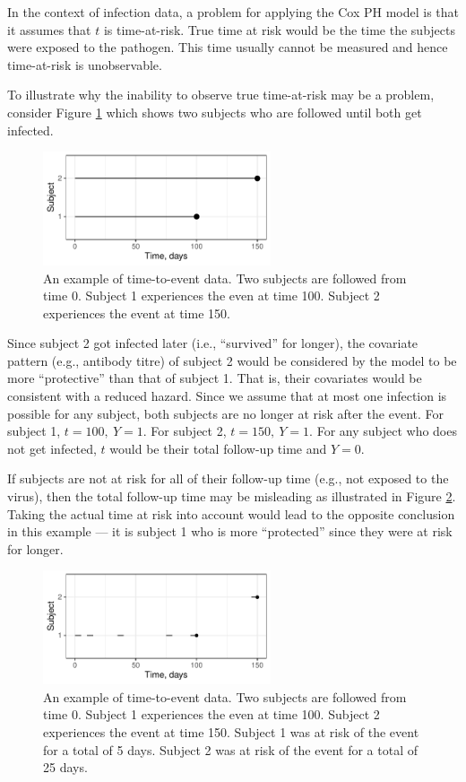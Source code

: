 In the context of infection data, a problem for applying the Cox PH model is that it assumes that $t$ is time-at-risk. True time at risk would be the time the subjects were exposed to the pathogen. This time usually cannot be measured and hence time-at-risk is unobservable.

To illustrate why the inability to observe true time-at-risk may be a problem, consider Figure \ref{CoxExampleFull} which shows two subjects who are followed until both get infected.

\begin{figure}[htp]
	\centering
	\includegraphics[width=0.6\textwidth]{../curve-cox/timeplot_1_light.pdf}
	\caption{
		An example of time-to-event data. Two subjects are followed from time 0. Subject 1 experiences the even at time 100. Subject 2 experiences the event at time 150.
	}
	\label{CoxExampleFull}
\end{figure}

Since subject 2 got infected later (i.e., ``survived'' for longer), the covariate pattern (e.g., antibody titre) of subject 2 would be considered by the model to be more ``protective'' than that of subject 1. That is, their covariates would be consistent with a reduced hazard. Since we assume that at most one infection is possible for any subject, both subjects are no longer at risk after the event. For subject 1, $t=100,\ Y=1$. For subject 2, $t=150,\ Y=1$. For any subject who does not get infected, $t$ would be their total follow-up time and $Y=0$.

If subjects are not at risk for all of their follow-up time (e.g., not exposed to the virus), then the total follow-up time may be misleading as illustrated in Figure \ref{CoxExamplePartial}. Taking the actual time at risk into account would lead to the opposite conclusion in this example --- it is subject 1 who is more ``protected'' since they were at risk for longer.

\begin{figure}[htp]
	\centering
	\includegraphics[width=0.6\textwidth]{../curve-cox/timeplot_2_light.pdf}
	\caption{
		An example of time-to-event data. Two subjects are followed from time 0. Subject 1 experiences the even at time 100. Subject 2 experiences the event at time 150. Subject 1 was at risk of the event for a total of 5 days. Subject 2 was at risk of the event for a total of 25 days.
	}
	\label{CoxExamplePartial}
\end{figure}

